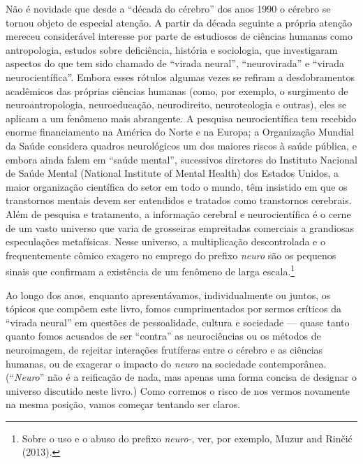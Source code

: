 Não é novidade que desde a ``década do cérebro'' dos anos 1990 o cérebro
se tornou objeto de especial atenção. A partir da década seguinte a
própria atenção mereceu considerável interesse por parte de estudiosos
de ciências humanas como antropologia, estudos sobre deficiência,
história e sociologia, que investigaram aspectos do que tem sido chamado
de ``virada neural'', ``neurovirada'' e ``virada neurocientífica''.
Embora esses rótulos algumas vezes se refiram a desdobramentos
acadêmicos das próprias ciências humanas (como, por exemplo, o
surgimento de neuroantropologia, neuroeducação, neurodireito,
neuroteologia e outras), eles se aplicam a um fenômeno mais abrangente.
A pesquisa neurocientífica tem recebido enorme financiamento na América
do Norte e na Europa; a Organização Mundial da Saúde considera quadros
neurológicos um dos maiores riscos à saúde pública, e embora ainda falem
em ``saúde mental'', sucessivos diretores do Instituto Nacional de Saúde
Mental (National Institute of Mental Health) dos Estados Unidos, a maior
organização científica do setor em todo o mundo, têm insistido em que os
transtornos mentais devem ser entendidos e tratados como transtornos
cerebrais. Além de pesquisa e tratamento, a informação cerebral e
neurocientífica é o cerne de um vasto universo que varia de grosseiras
empreitadas comerciais a grandiosas especulações metafísicas. Nesse
universo, a multiplicação descontrolada e o frequentemente cômico
exagero no emprego do prefixo \emph{neuro} são os pequenos sinais que
confirmam a existência de um fenômeno de larga
escala.\footnote{Sobre o uso e o abuso do prefixo \emph{neuro-}, ver, por exemplo,
Muzur and Rinčić (2013).}

Ao longo dos anos, enquanto apresentávamos, individualmente ou juntos,
os tópicos que compõem este livro, fomos cumprimentados por sermos
críticos da ``virada neural'' em questões de pessoalidade, cultura e
sociedade --- quase tanto quanto fomos acusados de ser ``contra'' as
neurociências ou os métodos de neuroimagem, de rejeitar interações
frutíferas entre o cérebro e as ciências humanas, ou de exagerar o
impacto do \emph{neuro} na sociedade contemporânea. (``\emph{Neuro}''
não é a reificação de nada, mas apenas uma forma concisa de designar o
universo discutido neste livro.) Como corremos o risco de nos vermos
novamente na mesma posição, vamos começar tentando ser claros.

